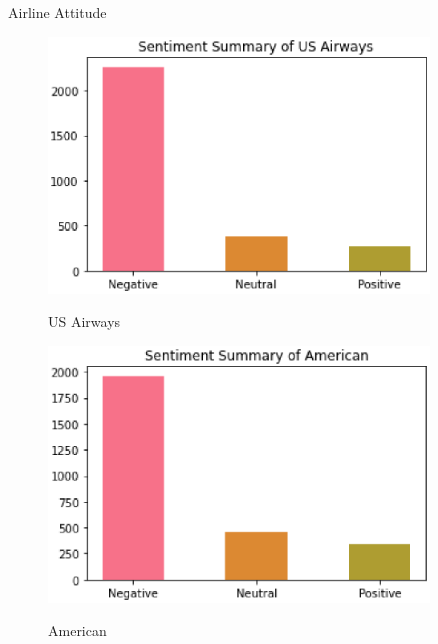 \documentclass[
 size=14pt,
 paper=smartboard,  %
 mode=present, 		%
 display=slides, 	%
 style=tuliplab,  	%
 pauseslide,
 fleqn,leqno]{powerdot}
\begin{document}
\begin{slide}{Airline Attitude}
  \begin{figure}[htbp]
    \centering
    \begin{minipage}[t]{0.48\textwidth}
      \centering
      \includegraphics[width=0.9\textwidth]{figures//us.eps}\\
      \vspace{-1.4em}
      \caption{US Airways}
    \end{minipage}
    \begin{minipage}[t]{0.48\textwidth}
      \centering
      \includegraphics[width=0.9\textwidth]{figures//american.eps}\\
      \vspace{-1.4em}
      \caption{American}
    \end{minipage}
  \end{figure}
\end{slide}
\end{document}
